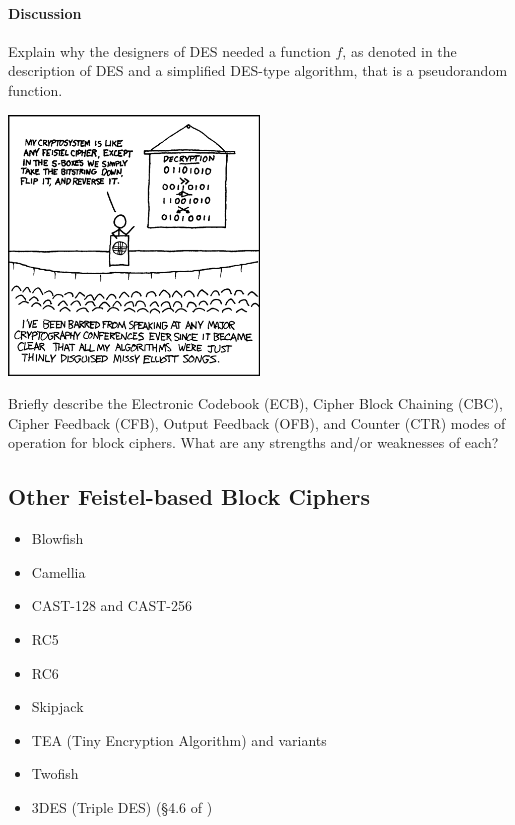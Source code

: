 \paragraph*{Discussion} Explain why the designers of DES needed a function $f$, as denoted in the description of DES and a simplified DES-type algorithm, that is a pseudorandom function.

\begin{center}
\includegraphics[width=0.5\textwidth]{img/cryptography-xkcd.png}
\end{center}

\begin{problem} [20 points]
Briefly describe the Electronic Codebook (ECB), Cipher Block Chaining (CBC), Cipher Feedback (CFB),  Output Feedback (OFB), and Counter (CTR) modes of operation for block ciphers. What are any strengths and/or weaknesses of each?
\end{problem}
		\subsection{Other Feistel-based Block Ciphers}

		\begin{itemize}
			\item Blowfish
			\item Camellia
			\item CAST-128 and CAST-256
			\item RC5
			\item RC6
			\item Skipjack
			\item TEA (Tiny Encryption Algorithm) and variants
			\item Twofish
			\item 3DES (Triple DES) (\S 4.6 of \cite{tw})
		\end{itemize}

